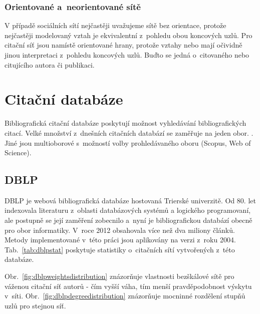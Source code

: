 \documentclass{bakalarka}
\begin{document}
\subsection{Orientované a~neorientované sítě}
V případě sociálních sítí nejčastěji uvažujeme sítě bez orientace, protože
nejčastěji modelovaný vztah  je ekvivalentní z~pohledu obou
koncových uzlů. Pro citační síť jsou namístě orientované hrany, protože vztahy
 nebo  mají očividně jinou interpretaci z~pohledu koncových uzlů. Buďto se
jedná o~citovaného nebo citujícího autora či publikaci.


\chapter{Citační databáze}
Bibliografická citační databáze poskytují možnost vyhledávání bibliografických
citací. Velké množství z~dnešních citačních databází se zaměřuje na jeden obor.
\citep{libraryamnh}.  Jiné jsou multioborové s~možností volby prohledávaného
oboru (Scopus, Web of Science).

\section{DBLP}
DBLP \citep{DBLP} je webová bibliografická databáze hostovaná Trierské
univerzitě. Od 80. let indexovala literaturu z~oblasti databázových systémů a
logického programovaní, ale postupně se její zaměření zobecnilo a~nyní je
bibliografickou databází obecně pro obor informatiky.  V~roce 2012 obsahovala
více než dva miliony článků. Metody implementované v~této práci jsou aplikovány
na verzi z~roku 2004. Tab.~\ref{tab:dblpstat} poskytuje statistiky o~citačních
sítí vytvořených z~této databáze.  

Obr.~\ref{fig:dblpweightsdistribution} znázorňuje vlastnosti bezškálové sítě
pro váženou citační síť autorů - čím vyšší váha, tím menší pravděpodobnost
výskytu v~síti.  Obr.~\ref{fig:dblpdegreedistribution} znázorňuje mocninné
rozdělení stupňů uzlů pro stejnou síť.
\end{document}
